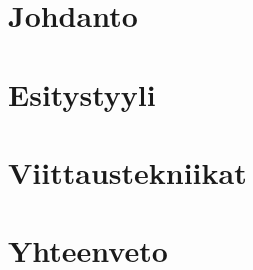 \tableofcontents




\glsaddall
{}
\setlength{\glsnamewidth}{0.25\textwidth}
\setlength{\glsdescwidth}{0.75\textwidth}
\renewcommand*{\glsgroupskip}{}

\printglossary[title={Lyhenteet ja merkinnät}]



\mainmatter

\chapter{Johdanto}
\label{ch:johdanto}



\chapter{Esitystyyli}
\label{ch:esitystyyli}


\chapter{Viittaustekniikat}
\label{ch:viittaustekniikat}



\chapter{Yhteenveto}
\label{ch:yhteenveto}


